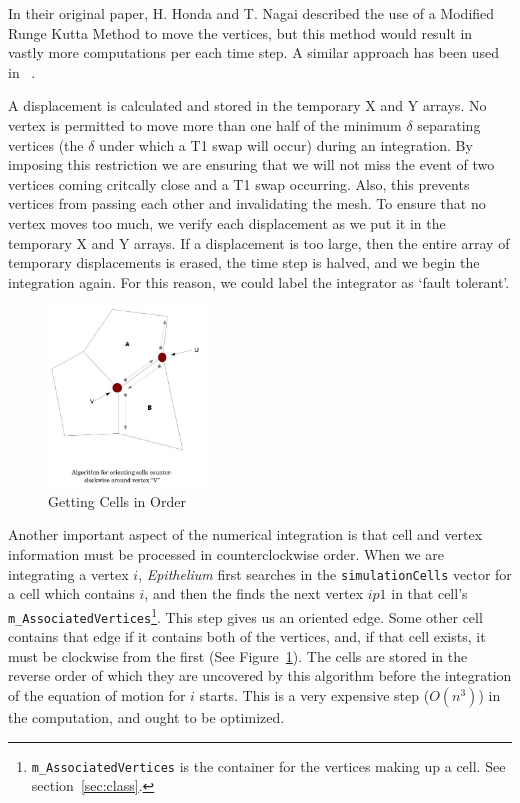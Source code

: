 In their original paper, H. Honda and T. Nagai described the use of a Modified Runge Kutta Method\cite{HondaNagai} to move the vertices, but this method would result in vastly more computations per each time step. A similar approach has been used in ~\cite{WO, ChasteMain}. 

A displacement is calculated and stored in the temporary X and Y arrays. No vertex is permitted to move more than one half of the minimum $\delta$ separating vertices (the $\delta$ under which a T1 swap will occur) during an integration. By imposing this restriction we are ensuring that we will not miss the event of two vertices coming critcally close and a T1 swap occurring. Also, this prevents vertices from passing each other and invalidating the mesh. To ensure that no vertex moves too much, we verify each displacement as we put it in the temporary X and Y arrays. If a displacement is too large, then the entire array of temporary displacements is erased, the time step is halved, and we begin the integration again. For this reason, we could label the integrator as `fault tolerant'.

\begin{figure}
\begin{center}
\includegraphics[width=0.38\textwidth]{../diagrams/counterclockwise.jpg}
\end{center}
\caption{Getting Cells in Order}
\label{fig:ctrclockwise}
\end{figure}

Another important aspect of the numerical integration is that cell and vertex information must be processed in counterclockwise order. When we are integrating a vertex $i$, \emph{Epithelium} first searches in the \texttt{simulationCells} vector for a cell which contains $i$, and then the finds the next vertex $ip1$ in that cell's \texttt{m\_AssociatedVertices}\footnote{\texttt{m\_AssociatedVertices} is the container for the vertices making up a cell. See section~\ref{sec:class}.}. This step gives us an oriented edge. Some other cell contains that edge if it contains both of the vertices, and, if that cell exists, it must be clockwise from the first (See Figure~\ref{fig:ctrclockwise}). The cells are stored in the reverse order of which they are uncovered by this algorithm before the integration of the equation of motion for $i$ starts. This is a very expensive step ($O(n^3)$) in the computation, and ought to be optimized.

